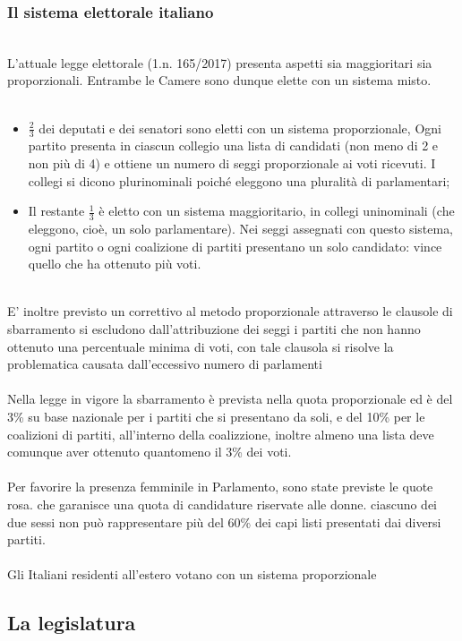 \documentclass{report}
\begin{document}
\subsubsection{Il sistema elettorale italiano}
\\
L'attuale legge elettorale (1.n. 165/2017) presenta aspetti sia maggioritari sia proporzionali. Entrambe le Camere sono dunque elette con un sistema misto.
\\
\\
\begin{itemize}
  \item $\frac{2}{3}$ dei deputati e dei senatori sono eletti con un sistema proporzionale, Ogni partito presenta in ciascun collegio una lista di candidati (non meno di 2 e non più di 4) e ottiene un numero di seggi proporzionale ai voti ricevuti. I collegi si dicono plurinominali poiché eleggono una pluralità di parlamentari;
  \item Il restante $\frac{1}{3}$ è eletto con un sistema maggioritario, in collegi uninominali (che eleggono, cioè, un solo parlamentare). Nei seggi assegnati con questo sistema, ogni partito o ogni coalizione di partiti presentano un solo candidato: vince quello che ha ottenuto più voti.
\end{itemize}
\\
E' inoltre previsto un correttivo al metodo proporzionale attraverso le clausole di sbarramento si escludono dall'attribuzione dei seggi i partiti che non hanno ottenuto una percentuale minima di voti, con tale clausola si risolve la problematica causata dall'eccessivo numero di parlamenti
\\
\\
Nella legge in vigore la sbarramento è prevista nella quota proporzionale ed è del 3\% su base nazionale per i partiti che si presentano da soli, e del 10\% per le coalizioni di partiti, all'interno della coalizzione, inoltre almeno una lista deve comunque aver ottenuto quantomeno il 3\% dei voti.
\\
\\
Per favorire la presenza femminile in Parlamento, sono state previste le quote rosa. che garanisce una quota di candidature riservate alle donne. ciascuno dei due sessi non può rappresentare più del 60\% dei capi listi presentati dai diversi partiti.
\\
\\
Gli Italiani residenti all'estero votano con un sistema proporzionale
\\
\subsection{La legislatura}
\\
\end{document}
